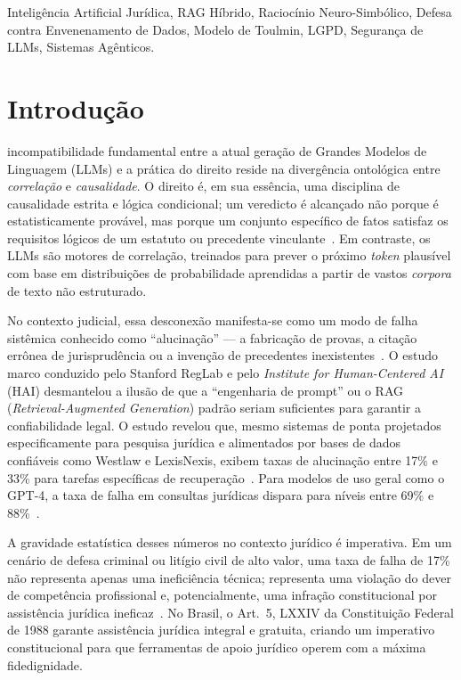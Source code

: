 \documentclass[journal,10pt]{IEEEtran}
\begin{document}
\begin{IEEEkeywords}
Intelig\^{e}ncia Artificial Jur\'{i}dica, RAG H\'{i}brido, Racioc\'{i}nio Neuro-Simb\'{o}lico, Defesa contra Envenenamento de Dados, Modelo de Toulmin, LGPD, Seguran\c{c}a de LLMs, Sistemas Ag\^{e}nticos.
\end{IEEEkeywords}

\section{Introdu\c{c}\~{a}o}
 incompatibilidade fundamental entre a atual gera\c{c}\~{a}o de Grandes Modelos de Linguagem (LLMs) e a pr\'{a}tica do direito reside na diverg\^{e}ncia ontol\'{o}gica entre \textit{correla\c{c}\~{a}o} e \textit{causalidade}. O direito \'{e}, em sua ess\^{e}ncia, uma disciplina de causalidade estrita e l\'{o}gica condicional; um veredicto \'{e} alcan\c{c}ado n\~{a}o porque \'{e} estatisticamente prov\'{a}vel, mas porque um conjunto espec\'{i}fico de fatos satisfaz os requisitos l\'{o}gicos de um estatuto ou precedente vinculante~\cite{hoya2025}. Em contraste, os LLMs s\~{a}o motores de correla\c{c}\~{a}o, treinados para prever o pr\'{o}ximo \textit{token} plaus\'{i}vel com base em distribui\c{c}\~{o}es de probabilidade aprendidas a partir de vastos \textit{corpora} de texto n\~{a}o estruturado.

No contexto judicial, essa desconex\~{a}o manifesta-se como um modo de falha sist\^{e}mica conhecido como ``alucina\c{c}\~{a}o'' --- a fabrica\c{c}\~{a}o de provas, a cita\c{c}\~{a}o err\^{o}nea de jurisprud\^{e}ncia ou a inven\c{c}\~{a}o de precedentes inexistentes~\cite{magesh2024}. O estudo marco conduzido pelo Stanford RegLab e pelo \textit{Institute for Human-Centered AI} (HAI) desmantelou a ilus\~{a}o de que a ``engenharia de prompt'' ou o RAG (\textit{Retrieval-Augmented Generation}) padr\~{a}o seriam suficientes para garantir a confiabilidade legal. O estudo revelou que, mesmo sistemas de ponta projetados especificamente para pesquisa jur\'{i}dica e alimentados por bases de dados confi\'{a}veis como Westlaw e LexisNexis, exibem taxas de alucina\c{c}\~{a}o entre 17\% e 33\% para tarefas espec\'{i}ficas de recupera\c{c}\~{a}o~\cite{dho2024}. Para modelos de uso geral como o GPT-4, a taxa de falha em consultas jur\'{i}dicas dispara para n\'{i}veis entre 69\% e 88\%~\cite{hoya2025}.

A gravidade estat\'{i}stica desses n\'{u}meros no contexto jur\'{i}dico \'{e} imperativa. Em um cen\'{a}rio de defesa criminal ou lit\'{i}gio civil de alto valor, uma taxa de falha de 17\% n\~{a}o representa apenas uma inefici\^{e}ncia t\'{e}cnica; representa uma viola\c{c}\~{a}o do dever de compet\^{e}ncia profissional e, potencialmente, uma infra\c{c}\~{a}o constitucional por assist\^{e}ncia jur\'{i}dica ineficaz~\cite{magesh2024}. No Brasil, o Art.~5\textordmasculine{}, LXXIV da Constitui\c{c}\~{a}o Federal de 1988 garante assist\^{e}ncia jur\'{i}dica integral e gratuita, criando um imperativo constitucional para que ferramentas de apoio jur\'{i}dico operem com a m\'{a}xima fidedignidade.
\end{document}

